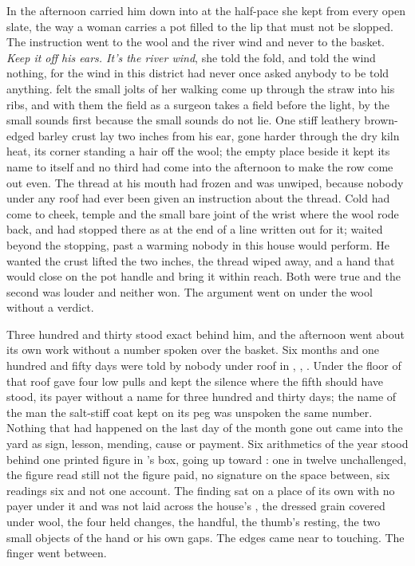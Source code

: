 In the afternoon  carried him down into  at the half-pace she kept from every open slate, the way a woman carries a pot filled to the lip that must not be slopped. The instruction went to the wool and the river wind and never to the basket. \emph{Keep it off his ears. It's the river wind}, she told the fold, and told the wind nothing, for the wind in this district had never once asked anybody to be told anything.  felt the small jolts of her walking come up through the straw into his ribs, and with them the field as a surgeon takes a field before the light, by the small sounds first because the small sounds do not lie. One stiff leathery brown-edged barley crust lay two inches from his ear, gone harder through the dry kiln heat, its corner standing a hair off the wool; the empty place beside it kept its name to itself and no third had come into the afternoon to make the row come out even. The thread at his mouth had frozen and was unwiped, because nobody under any roof had ever been given an instruction about the thread. Cold had come to cheek, temple and the small bare joint of the wrist where the wool rode back, and had stopped there as at the end of a line written out for it;  waited beyond the stopping, past a warming nobody in this house would perform. He wanted the crust lifted the two inches, the thread wiped away, and a hand that would close on the pot handle and bring it within reach. Both were true and the second was louder and neither won. The argument went on under the wool without a verdict.

Three hundred and thirty stood exact behind him, and the afternoon went about its own work without a number spoken over the basket. Six months and one hundred and fifty days were told by nobody under  roof in , , . Under the floor of that roof  gave four low pulls and kept the silence where the fifth should have stood, its payer without a name for three hundred and thirty days; the name of the man the salt-stiff coat kept on its peg was unspoken the same number. Nothing that had happened on the last day of the month gone out came into the yard as sign, lesson, mending, cause or payment. Six arithmetics of the year stood behind one printed figure in 's box, going up  toward : one in twelve unchallenged, the figure read still not the figure paid, no signature on the space between, six readings six and not one account. The finding sat on a place of its own with no payer under it and was not laid across the house's , the dressed grain covered under wool, the four held changes, the handful, the thumb's resting, the two small objects of the hand or his own gaps. The edges came near to touching. The finger went between.


